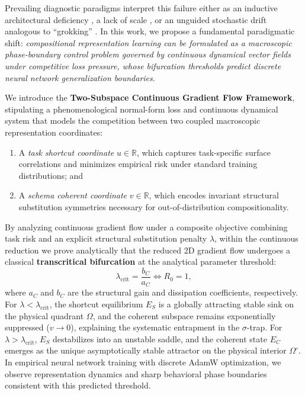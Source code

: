 \documentclass{article}
\theoremstyle{plain}
\theoremstyle{definition}
\begin{document}
Prevailing diagnostic paradigms interpret this failure either as an inductive architectural deficiency \citep{Lake2018Generalization,Kazemnejad2023Impact}, a lack of scale \citep{Drozdov2022Compositional}, or an unguided stochastic drift analogous to ``grokking'' \citep{Power2022Grokking,Liu2022Grokking,Varma2023Explaining}. In this work, we propose a fundamental paradigmatic shift: \emph{compositional representation learning can be formulated as a macroscopic phase-boundary control problem governed by continuous dynamical vector fields under competitive loss pressure, whose bifurcation thresholds predict discrete neural network generalization boundaries}.

We introduce the \textbf{Two-Subspace Continuous Gradient Flow Framework}, stipulating a phenomenological normal-form loss and continuous dynamical system that models the competition between two coupled macroscopic representation coordinates:
\begin{enumerate}[leftmargin=*,noitemsep]
    \item A \emph{task shortcut coordinate} $u \in \mathbb{R}$, which captures task-specific surface correlations and minimizes empirical risk under standard training distributions; and
    \item A \emph{schema coherent coordinate} $v \in \mathbb{R}$, which encodes invariant structural substitution symmetries necessary for out-of-distribution compositionality.
\end{enumerate}

By analyzing continuous gradient flow under a composite objective combining task risk and an explicit structural substitution penalty $\lambda$, within the continuous reduction we prove analytically that the reduced 2D gradient flow undergoes a classical \textbf{transcritical bifurcation} at the analytical parameter threshold:
\begin{equation}
    \lambda_{\text{crit}} = \frac{b_C}{a_C} \iff R_0 = 1,
    \label{eq:critical_law_intro}
\end{equation}
where $a_C$ and $b_C$ are the structural gain and dissipation coefficients, respectively. For $\lambda < \lambda_{\text{crit}}$, the shortcut equilibrium $E_S$ is a globally attracting stable sink on the physical quadrant $\Omega$, and the coherent subspace remains exponentially suppressed ($v \to 0$), explaining the systematic entrapment in the $\sigma$-trap. For $\lambda > \lambda_{\text{crit}}$, $E_S$ destabilizes into an unstable saddle, and the coherent state $E_C$ emerges as the unique asymptotically stable attractor on the physical interior $\Omega^\circ$. In empirical neural network training with discrete AdamW optimization, we observe representation dynamics and sharp behavioral phase boundaries consistent with this predicted threshold.
\end{document}
